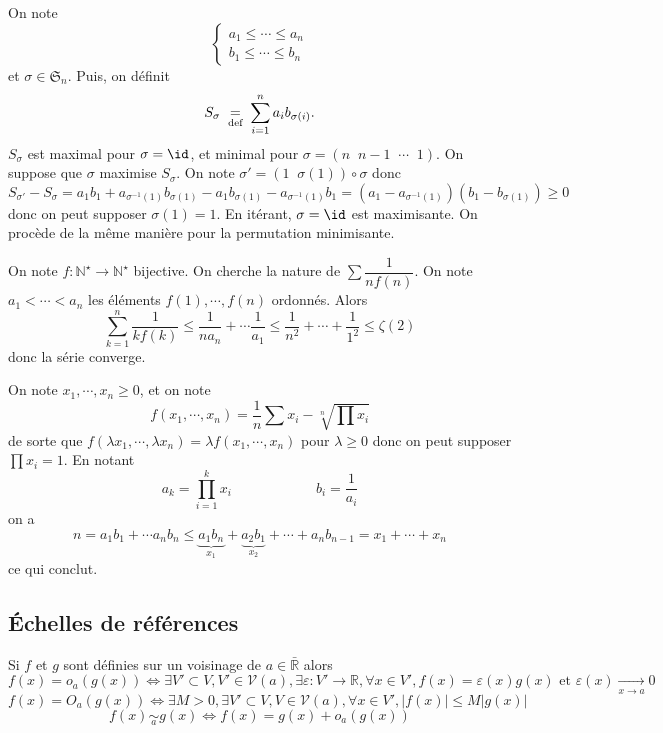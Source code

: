 On note \[
    \begin{cases}
        a_1\leq \cdots \leq a_n\\ b_1\leq \cdots \leq b_n
    \end{cases}
\]
et $\sigma\in\mathfrak S_n$. Puis, on définit \[
    S_\sigma\;\underset{\text{def}}=\;\sum_{i=1}^na_ib_{\sigma(i)}.
\]
$S_\sigma$ est maximal pour $\sigma=\id$, et minimal pour $\sigma=(n\;\;n-1\;\;\cdots \;\; 1)$. On suppose que $\sigma$ maximise $S_\sigma$. On note $\sigma'=(1\;\;\sigma(1))\circ \sigma$ donc \[ S_{\sigma'}-S_\sigma=a_1b_1+a_{\sigma^{-1}(1)}b_{\sigma(1)}-a_1b_{\sigma(1)}-a_{\sigma^{-1}(1)}b_1 =(a_1-a_{\sigma^{-1}(1)})(b_1-b_{\sigma(1)})\geq 0\]
donc on peut supposer $\sigma(1)=1$. En itérant, $\sigma=\id$ est maximisante. On procède de la même manière pour la permutation minimisante.

\begin{ex}[Application 1]
    On note $f:\mathbb N^\star\to\mathbb N^\star$ bijective. On cherche la nature de $\sum\dfrac1{nf(n)}$.
    On note $a_1<\cdots <a_n$ les éléments $f(1), \cdots, f(n)$ ordonnés. Alors \[
        \sum_{k=1}^n\frac1{kf(k)}\leq \frac1{na_n}+\cdots \frac1{a_1}\leq \frac1{n^2}+\cdots +\frac1{1^2}\leq\zeta(2)
    \]
    donc la série converge.
\end{ex}

\begin{ex}[Inégalité AM-GM]
    On note $x_1, \cdots, x_n\geq 0$, et on note \[
        f(x_1, \cdots, x_n)=\frac1n\sum x_i-\sqrt[n]{\prod x_i}
    \]
    de sorte que $f(\lambda x_1, \cdots, \lambda x_n)=\lambda f(x_1, \cdots, x_n)$ pour $\lambda\geq 0$ donc on peut supposer $\prod x_i=1$. En notant \[
        a_k=\prod_{i=1}^kx_i\qquad\qquad\qquad b_i=\frac1{a_i}
    \]
    on a \[
        n=a_1b_1+\cdots a_nb_n\leq \underbrace{a_1b_n}_{x_1}+\underbrace{a_2b_1}_{x_2}+\cdots + a_nb_{n-1}=x_1+\cdots+x_n
    \]
    ce qui conclut.
\end{ex}

\subsection{Échelles de références}

\begin{dfn}[Rappels]
    Si $f$ et $g$ sont définies sur un voisinage de $a\in\bar{\mathbb R}$ alors \[
        f(x)=o_a(g(x))\iff \exists V'\subset V, V'\in\mathcal V(a), \exists \varepsilon:V'\to\mathbb R, \forall x\in V', f(x)=\varepsilon(x)g(x)\text{ et }\varepsilon(x)\xrightarrow[x\to a]{}0
    \]
    \[
        f(x)=O_a(g(x))\iff \exists M>0, \exists V'\subset V, V\in\mathcal V(a), \forall x\in V', |f(x)|\leq M|g(x)|
    \]
    \[
        f(x)\underset a\sim g(x)\iff f(x)=g(x)+o_a(g(x))
    \]
\end{dfn}


